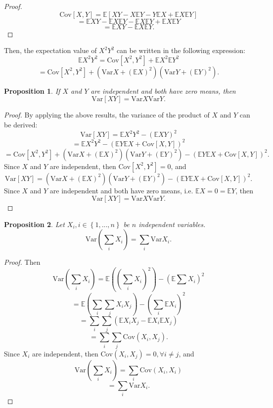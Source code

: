 \documentclass{article}
\theoremstyle{plain}
\theoremstyle{plain} %
\newtheorem{proposition}{Proposition}
\theoremstyle{definition}  %
\theoremstyle{remark}  %
\theoremstyle{plain}
\begin{document}
\begin{proof}
$$
\text{Cov}[X,Y]=\mathbb{E} \left[ XY -X\mathbb{E} Y -Y\mathbb{E}X +\mathbb{E}X \mathbb{E}Y\right]
$$
$$
=\mathbb{E}XY-\mathbb{E}X\mathbb{E}Y-\mathbb{E}X\mathbb{E}Y+\mathbb{E}X\mathbb{E}Y
$$
$$
=\mathbb{E}XY-\mathbb{E}X\mathbb{E}Y.
$$
\end{proof}

Then, the expectation value of $X^2Y^2$ can be written in the following expression:
$$
\mathbb{E}X^2Y^2=\text{Cov}[X^2,Y^2]+\mathbb{E}X^2\mathbb{E}Y^2
$$
$$
=\text{Cov}[X^2,Y^2]+(\text{Var}X+(\mathbb{E} X)^2)(\text{Var}Y+(\mathbb{E} Y)^2).
$$

\begin{proposition}
If $X$ and $Y$ are independent and both have zero means, then 
$$
\text{Var}[XY]=\text{Var}X \text{Var}Y.
$$
\end{proposition}
\begin{proof}
By applying the above results, the variance of the product of $X$ and $Y$ can be derived:
$$
\text{Var}[XY]=\mathbb{E}X^2Y^2-(\mathbb{E}XY)^2
$$
$$
=\mathbb{E}X^2Y^2-(\mathbb{E}Y\mathbb{E}X+\text{Cov}[X,Y])^2
$$
$$
=\text{Cov}[X^2,Y^2]+(\text{Var}X+(\mathbb{E} X)^2)(\text{Var}Y+(\mathbb{E} Y)^2)-(\mathbb{E}Y\mathbb{E}X+\text{Cov}[X,Y])^2.
$$
Since $X$ and $Y$ are independent, then $\text{Cov}[X^2,Y^2]=0$, and 
$$
\text{Var}[XY]=(\text{Var}X+(\mathbb{E} X)^2)(\text{Var}Y+(\mathbb{E} Y)^2)-(\mathbb{E}Y\mathbb{E}X+\text{Cov}[X,Y])^2.
$$
Since $X$ and $Y$ are independent and both have zero means, i.e. $\mathbb{E}X=0=\mathbb{E}Y$, then
$$
\text{Var}[XY]=\text{Var}X \text{Var}Y.
$$
\end{proof}
\begin{proposition}
Let $X_i, i\in\left\lbrace 1,...,n\right\rbrace$ be $n$ independent variables. 
$$
\text{Var}\left( \sum\limits_{i} X_i\right)=\sum\limits_i \text{Var}X_i.
$$
\end{proposition}
\begin{proof}
Then 
$$
\text{Var}\left( \sum\limits_{i} X_i\right)=\mathbb{E} \left(\left( \sum\limits_{i}X_i\right)^2 \right)-\left( \mathbb{E} \sum X_i\right)^2
$$
$$
=\mathbb{E}\left( \sum\limits_{i}\sum\limits_{j}X_iX_j \right)-\left(\sum\limits_i \mathbb{E} X_i \right)^2
$$
$$
=\sum\limits_i\sum\limits_j \left( \mathbb{E}X_iX_j-\mathbb{E}X_i\mathbb{E}X_j\right)
$$
$$
=\sum\limits_i\sum\limits_j \text{Cov}\left( X_i,X_j\right).
$$
Since $X_i$ are independent, then $\text{Cov}\left( X_i,X_j\right)=0, \forall i\neq j$, and
$$
\text{Var}\left( \sum\limits_{i} X_i\right)=\sum\limits_i \text{Cov}\left( X_i,X_i\right)
$$
$$
=\sum\limits_i \text{Var}X_i.
$$
\end{proof}
\end{document}

